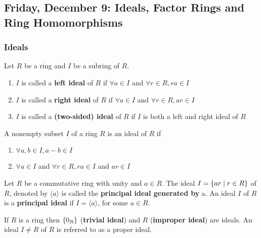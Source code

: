 \subsection{Friday, December 9: Ideals, Factor Rings and Ring Homomorphisms}

\subsubsection{Ideals}

\begin{definition}[Ideals]
    Let $R$ be a ring and $I$ be a subring of $R$.
    \begin{enumerate}
        \item $I$ is called a \textbf{left ideal} of $R$ if $\forall a \in I$ and $\forall r \in R, ra \in I$
        \item $I$ is called a \textbf{right ideal} of $R$ if $\forall a \in I$ and $\forall r \in R, ar \in I$
        \item $I$ is called a \textbf{(two-sided) ideal} of $R$ if $I$ is both a left and right ideal of $R$
    \end{enumerate}
\end{definition}

\begin{theorem}
    A nonempty subset $I$ of a ring $R$ is an ideal of $R$ if 
    \begin{enumerate}
        \item $\forall a, b \in I, a - b \in I$
        \item $\forall a \in I$ and $\forall r \in R, ra \in I$ and $ar \in I$
    \end{enumerate}
\end{theorem}

\begin{definition}
    Let $R$ be a commutative ring with unity and $a \in R$. The ideal $I = \qty{ar \mid r \in R}$ of $R$, denoted by $\langle a \rangle$ is called the \textbf{principal ideal generated by} a. An ideal $I$ of $R$ is a \textbf{principal ideal} if $I = \langle a \rangle$, for some $a \in R$. 
\end{definition}

\begin{definition}
    If $R$ is a ring then $\qty{0_R}$ (\textbf{trivial ideal}) and $R$ (\textbf{improper ideal}) are ideals. An ideal $I \neq  R$ of $R$ is referred to as a proper ideal.    
\end{definition}


